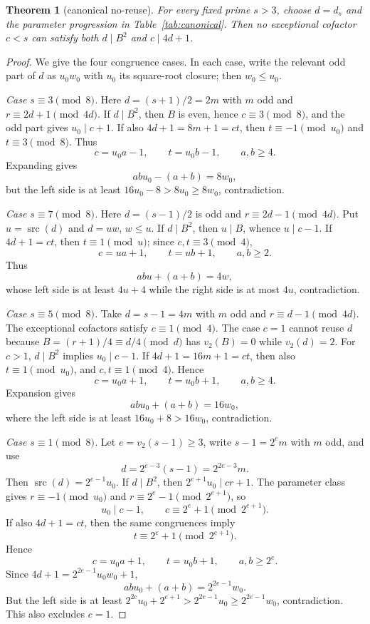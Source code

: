\documentclass[11pt]{article}
\newtheorem{theorem}{Theorem}
\theoremstyle{definition}
\newcommand{\src}{\operatorname{src}}
\begin{document}
\begin{theorem}[canonical no-reuse]\label{thm:noreuse}
For every fixed prime $s>3$, choose $d=d_s$ and the parameter progression in Table~\ref{tab:canonical}. Then no exceptional cofactor $c<s$ can satisfy both $d\mid B^2$ and $c\mid4d+1$.
\end{theorem}

\begin{proof}
We give the four congruence cases. In each case, write the relevant odd part of $d$ as $u_0w_0$ with $u_0$ its square-root closure; then $w_0\le u_0$.

\emph{Case $s\equiv3\pmod8$.} Here $d=(s+1)/2=2m$ with $m$ odd and $r\equiv2d+1\pmod{4d}$. If $d\mid B^2$, then $B$ is even, hence $c\equiv3\pmod8$, and the odd part gives $u_0\mid c+1$. If also $4d+1=8m+1=ct$, then $t\equiv-1\pmod{u_0}$ and $t\equiv3\pmod8$. Thus
\[
c=u_0a-1,\qquad t=u_0b-1,\qquad a,b\ge4.
\]
Expanding gives
\[
ab u_0-(a+b)=8w_0,
\]
but the left side is at least $16u_0-8>8u_0\ge8w_0$, contradiction.

\emph{Case $s\equiv7\pmod8$.} Here $d=(s-1)/2$ is odd and $r\equiv2d-1\pmod{4d}$. Put $u=\src(d)$ and $d=uw$, $w\le u$. If $d\mid B^2$, then $u\mid B$, whence $u\mid c-1$. If $4d+1=ct$, then $t\equiv1\pmod u$; since $c,t\equiv3\pmod4$,
\[
c=ua+1,\qquad t=ub+1,\qquad a,b\ge2.
\]
Thus
\[
ab u+(a+b)=4w,
\]
whose left side is at least $4u+4$ while the right side is at most $4u$, contradiction.

\emph{Case $s\equiv5\pmod8$.} Take $d=s-1=4m$ with $m$ odd and $r\equiv d-1\pmod{4d}$. The exceptional cofactors satisfy $c\equiv1\pmod4$. The case $c=1$ cannot reuse $d$ because $B=(r+1)/4\equiv d/4\pmod d$ has $v_2(B)=0$ while $v_2(d)=2$. For $c>1$, $d\mid B^2$ implies $u_0\mid c-1$. If $4d+1=16m+1=ct$, then also $t\equiv1\pmod{u_0}$, and $c,t\equiv1\pmod4$. Hence
\[
c=u_0a+1,\qquad t=u_0b+1,\qquad a,b\ge4.
\]
Expansion gives
\[
ab u_0+(a+b)=16w_0,
\]
where the left side is at least $16u_0+8>16w_0$, contradiction.

\emph{Case $s\equiv1\pmod8$.} Let $e=v_2(s-1)\ge3$, write $s-1=2^e m$ with $m$ odd, and use
\[
d=2^{e-3}(s-1)=2^{2e-3}m.
\]
Then $\src(d)=2^{e-1}u_0$. If $d\mid B^2$, then $2^{e+1}u_0\mid cr+1$. The parameter class gives $r\equiv-1\pmod{u_0}$ and $r\equiv2^e-1\pmod{2^{e+1}}$, so
\[
u_0\mid c-1,\qquad c\equiv2^e+1\pmod{2^{e+1}}.
\]
If also $4d+1=ct$, then the same congruences imply
\[
t\equiv2^e+1\pmod{2^{e+1}}.
\]
Hence
\[
c=u_0a+1,\qquad t=u_0b+1,\qquad a,b\ge2^e.
\]
Since $4d+1=2^{2e-1}u_0w_0+1$,
\[
ab u_0+(a+b)=2^{2e-1}w_0.
\]
But the left side is at least $2^{2e}u_0+2^{e+1}>2^{2e-1}u_0\ge2^{2e-1}w_0$, contradiction. This also excludes $c=1$.
\end{proof}
\end{document}
